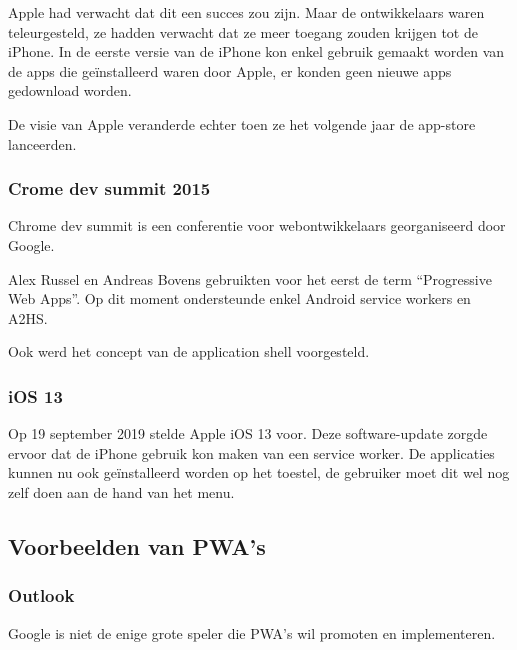 		Apple had verwacht dat dit een succes zou zijn. Maar de ontwikkelaars waren teleurgesteld, ze hadden verwacht dat ze meer toegang zouden krijgen tot de iPhone. In de eerste versie van de iPhone kon enkel gebruik gemaakt worden van de apps die geïnstalleerd waren door Apple, er konden geen nieuwe apps gedownload worden.
		\autocite{Strieb2016}
		
		 De visie van Apple veranderde echter toen ze het volgende jaar de app-store lanceerden. \autocite{Silver2018}
	 
	 \subsubsection{Crome dev summit 2015}
	 
		 Chrome dev summit is een conferentie voor webontwikkelaars georganiseerd door Google. 
		 
		 Alex Russel en Andreas Bovens gebruikten voor het eerst de term “Progressive Web Apps”. Op dit moment ondersteunde enkel Android service workers en A2HS.
		 
		 Ook werd het concept van de application shell voorgesteld.
		 \autocite{Russel2015}
	 
	 
	 \subsubsection{iOS 13}
		 Op 19 september 2019 stelde Apple iOS 13 voor. Deze software-update zorgde ervoor dat de iPhone gebruik kon maken van een service worker. De applicaties kunnen nu ook geïnstalleerd worden op het toestel, de gebruiker moet dit wel nog zelf doen aan de hand van het menu.
		 \autocite{Apple2020}
	 


\subsection{Voorbeelden van PWA's}
\label{ch: Voorbeelden}

	
	\subsubsection{Outlook}
		Google is niet de enige grote speler die PWA's wil promoten en implementeren.
		\autocite{Microsoft2020}
		
